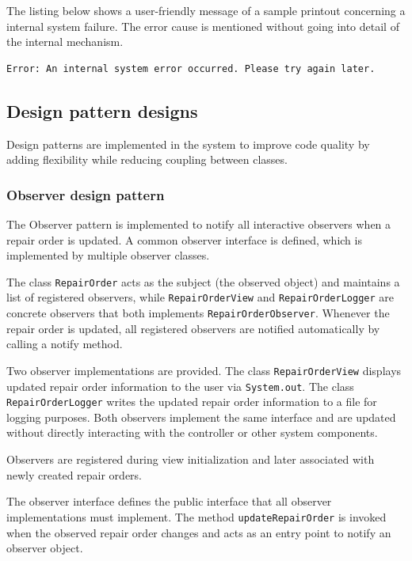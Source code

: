 \documentclass[a4paper]{scrartcl}
\begin{document}
The listing below shows a user-friendly message of a sample printout concerning a internal system failure. The error cause is mentioned without going into detail of the internal mechanism.

\begin{lstlisting}[style=outputstyle, caption={Checked exception as error message}]
Error: An internal system error occurred. Please try again later.
\end{lstlisting}

\subsection{Design pattern designs}

Design patterns are implemented in the system to improve code quality by adding flexibility while reducing coupling between classes.

\subsubsection{Observer design pattern}

The Observer pattern is implemented to notify all interactive observers when a repair order is updated. A common observer interface is defined, which is implemented by multiple observer classes.

The class \texttt{RepairOrder} acts as the subject (the observed object) and maintains a list of registered observers, while \texttt{RepairOrderView} and \texttt{RepairOrderLogger} are concrete observers that both implements \texttt{RepairOrderObserver}. Whenever the repair order is updated, all registered observers are notified automatically by calling a notify method.

Two observer implementations are provided. The class \texttt{RepairOrderView} displays updated repair order information to the user via \texttt{System.out}. The class \texttt{RepairOrderLogger} writes the updated repair order information to a file for logging purposes. Both observers implement the same interface and are updated without directly interacting with the controller or other system components.

Observers are registered during view initialization and later associated with newly created repair orders.

The observer interface defines the public interface that all observer implementations must implement. The method \texttt{updateRepairOrder} is invoked when the observed repair order changes and acts as an entry point to notify an observer object.
\end{document}
